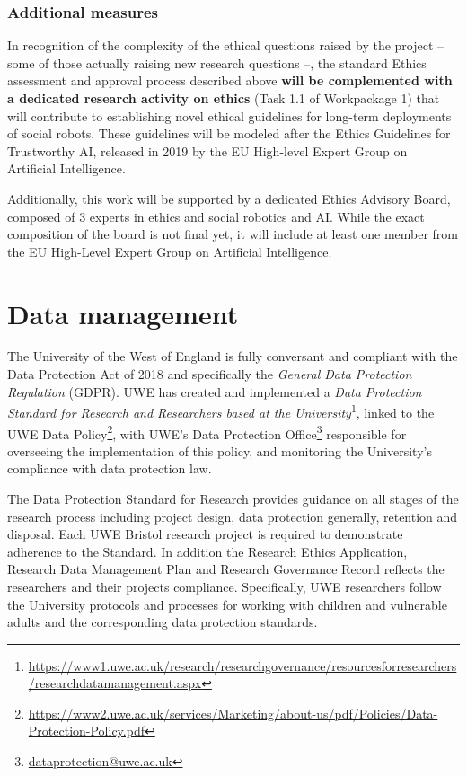 \documentclass[11pt,a4paper]{report}
\begin{document}
\subsubsection{Additional measures}

In recognition of the complexity of the ethical questions raised by the project --
some of those actually raising new research questions --, the standard Ethics
assessment and approval process described above \textbf{will be complemented with a
dedicated research activity on ethics} (Task 1.1 of Workpackage 1) that will
contribute to establishing novel ethical guidelines for long-term deployments of
social robots. These guidelines will be modeled after the Ethics Guidelines for
Trustworthy AI, released in 2019 by the EU High-level Expert Group on Artificial
Intelligence.

Additionally, this work will be supported by a dedicated Ethics Advisory Board,
composed of 3 experts in ethics and social robotics and AI. While the exact
composition of the board is not final yet, it will include at least one member
from the EU High-Level Expert Group on Artificial Intelligence.


\section{Data management}

The University of the West of England is fully conversant and compliant with
the Data Protection Act of 2018 and specifically the \emph{General Data
Protection Regulation} (GDPR). UWE has created and implemented a \emph{Data
Protection Standard for Research and Researchers based at the
University}\footnote{\url{https://www1.uwe.ac.uk/research/researchgovernance/resourcesforresearchers/researchdatamanagement.aspx}},
linked to the UWE Data
Policy\footnote{\url{https://www2.uwe.ac.uk/services/Marketing/about-us/pdf/Policies/Data-Protection-Policy.pdf}},
with UWE's Data Protection Office\footnote{\url{dataprotection@uwe.ac.uk}} responsible for overseeing the
implementation of this policy, and monitoring the University's compliance with
data protection law.

The Data Protection Standard for Research provides  guidance on all stages of
the research process including project design, data protection generally,
retention and disposal. Each UWE Bristol research project is required to
demonstrate adherence to the Standard. In addition the Research Ethics
Application, Research Data Management Plan and Research Governance Record
reflects the researchers and their projects compliance. Specifically, UWE
researchers follow the University protocols and processes for working with
children and vulnerable adults and the corresponding data protection standards.
\end{document}
